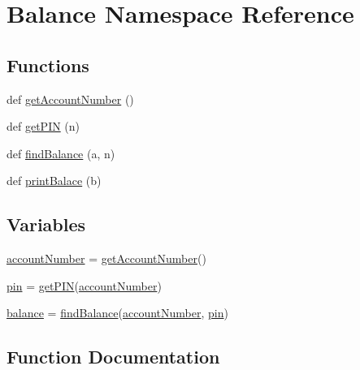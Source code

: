 \hypertarget{namespaceBalance}{}\section{Balance Namespace Reference}
\label{namespaceBalance}
\subsection*{Functions}
\begin{DoxyCompactItemize}
\item 
def \hyperlink{namespaceBalance_a0d3d5e4b10843823c119cb200c8eea1a}{get\+Account\+Number} ()
\item 
def \hyperlink{namespaceBalance_add692cc47f5beab77cc3eded4397ee84}{get\+P\+IN} (n)
\item 
def \hyperlink{namespaceBalance_a2087471cfcf15c70932c7a400f6e8b00}{find\+Balance} (a, n)
\item 
def \hyperlink{namespaceBalance_afedee86fdf9a70c8269974c695523986}{print\+Balace} (b)
\end{DoxyCompactItemize}
\subsection*{Variables}
\begin{DoxyCompactItemize}
\item 
\hyperlink{namespaceBalance_a526eb4cc966158b4a4d3b8d33c04340f}{account\+Number} = \hyperlink{namespaceBalance_a0d3d5e4b10843823c119cb200c8eea1a}{get\+Account\+Number}()
\item 
\hyperlink{namespaceBalance_a4cfe14f6e735fe18092e9809e4886137}{pin} = \hyperlink{namespaceBalance_add692cc47f5beab77cc3eded4397ee84}{get\+P\+IN}(\hyperlink{namespaceBalance_a526eb4cc966158b4a4d3b8d33c04340f}{account\+Number})
\item 
\hyperlink{namespaceBalance_a3a307687cae8694689c16220a9bb081c}{balance} = \hyperlink{namespaceBalance_a2087471cfcf15c70932c7a400f6e8b00}{find\+Balance}(\hyperlink{namespaceBalance_a526eb4cc966158b4a4d3b8d33c04340f}{account\+Number}, \hyperlink{namespaceBalance_a4cfe14f6e735fe18092e9809e4886137}{pin})
\end{DoxyCompactItemize}


\subsection{Function Documentation}
